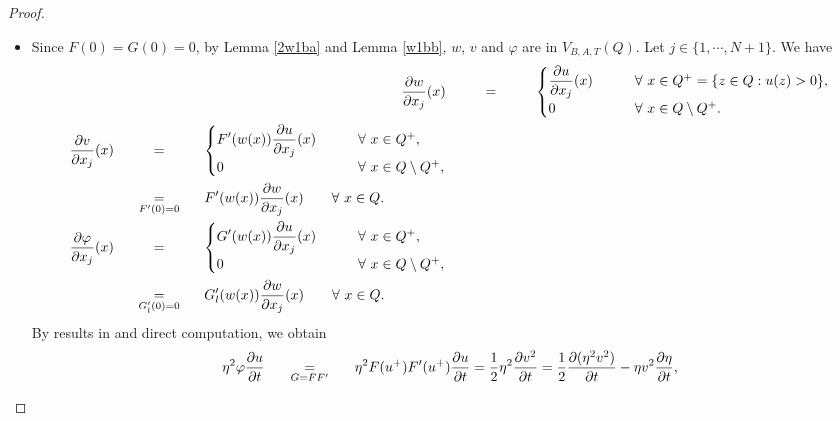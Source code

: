 \documentclass[11pt, a4paper]{article}
\numberwithin{equation}{section}
\newcommand{\coex}[2][\hphantom{longexplanation}]{%
  \underset{{#1}}{\overset{\hphantom{longexplanation}}{#2}}
}
\begin{document}
\begin{proof}
  \begin{itemize}[wide]
  \item[$(i)$] Since $F(0)=G(0)=0$, by Lemma \ref{2w1ba} and Lemma \ref{w1bb}, $w$,  $v$ and $\varphi$ are in $V_{B,A,T}(Q)$.  Let $j\in \{1,\cdots,N+1\}$. We have 
\begin{align}
  \frac{\partial w}{\partial x_{j}}(x)
  &\coex{=} \begin{cases}
\displaystyle\frac{\partial u}{\partial x_{j}}(x) \qquad&{\forall~x \in Q^{+}=\{z\in Q :u(z)>0\},}\\
0&{\forall~x \in Q\setminus Q^{+}}.
\end{cases}
    \label{le462aazz20}\\
  \label{le462aazz2}
  \begin{split}
    \frac{\partial v}{\partial x_{j}}(x)
    &\coex{=} \begin{cases}
      \displaystyle F'(w(x))\frac{\partial u}{\partial x_{j}}(x) \qquad&{\forall~x \in Q^{+},}\\
      0&{\forall~x \in Q\setminus Q^{+}},
\end{cases}
    \\
    &\coex[F'(0)=0]{=} F'(w(x))\frac{\partial w}{\partial
      x_{j}}(x)\qquad\forall~x \in Q.
  \end{split}\\
  \label{le462aazz3}
  \begin{split}
    \frac{\partial \varphi}{\partial x_{j}}(x)
  &\coex{=} \begin{cases}
    \displaystyle G'(w(x))\frac{\partial u}{\partial x_{j}}(x)  \qquad&{\forall~x \in Q^{+},}\\
    0&{\forall~x \in Q\setminus Q^{+},}
       \end{cases}
        \\
&\coex[G_{l}'(0)=0]{=} G_{l}'(w(x))\frac{\partial w}{\partial
  x_{j}}(x)\qquad\forall~x \in Q.
  \end{split}
\end{align}
By results in
\cite[pp.150-151]{gilbargEllipticPartialDifferential2001} and direct
computation, we obtain
\begin{align}
  \eta^{2}\varphi\frac{\partial u}{\partial t}
  \coex[G=FF']{=} \eta^{2}F(u^{+})F'(u^{+})\frac{\partial u}{\partial t}=\frac{1}{2}\eta^{2}\frac{\partial v^{2}}{\partial t}=\frac{1}{2}\frac{\partial (\eta^{2}v^{2})}{\partial t}-\eta v^{2}\frac{\partial\eta}{\partial t},
\label{pa1}
\end{align}

\end{itemize}
\end{proof}
\end{document}
